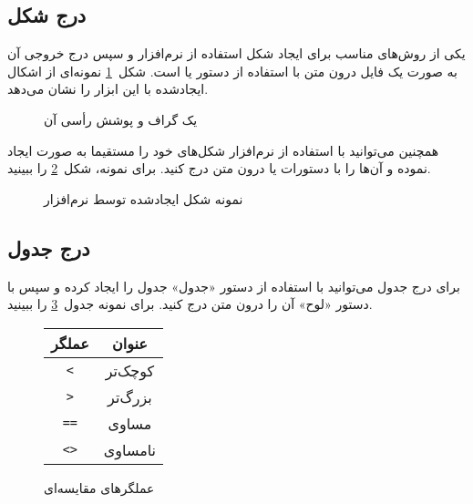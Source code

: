 \subsection{درج شکل}

یکی از روش‌های مناسب برای ایجاد شکل استفاده از نرم‌افزار  و سپس
درج خروجی آن به صورت یک فایل  درون متن
با استفاده از دستور   یا  است.
شکل~\ref{شکل:پوشش رأسی} نمونه‌ای از اشکال ایجادشده با این ابزار را نشان می‌دهد.


\begin{figure}[ht]
\caption{یک گراف و پوشش رأسی آن}
\label{شکل:پوشش رأسی}
\end{figure}

\bigskip
همچنین می‌توانید با استفاده از نرم‌افزار  شکل‌های خود را مستقیما
به صورت  ایجاد نموده و آن‌ها را با دستورات  یا  
درون متن درج کنید. برای نمونه، شکل~\ref{شکل:گراف جهت‌دار} را ببینید.


\begin{figure}[ht]
\caption{نمونه شکل ایجادشده توسط نرم‌افزار }
\label{شکل:گراف جهت‌دار}
\end{figure}


\subsection{درج جدول}

برای درج جدول می‌توانید با استفاده از دستور  «جدول»
جدول را ایجاد کرده و سپس با دستور  «لوح»  آن را درون متن درج کنید.
برای نمونه جدول~\ref{جدول:عملگرهای مقایسه‌ای} را ببینید.

\vspace{1.5em}
\begin{figure}[ht]
    \centering
    \caption{عملگرهای مقایسه‌ای}

    \begin{tabular}{|c|c|}
        \hline
        \textbf{عملگر} & \textbf{عنوان} \\
        \hline
        \texttt{<} & کوچک‌تر \\
        \texttt{>} & بزرگ‌تر \\
        \texttt{==} & مساوی \\
        \texttt{<>} & نامساوی \\
        \hline
    \end{tabular}

    \label{جدول:عملگرهای مقایسه‌ای}
\end{figure}




